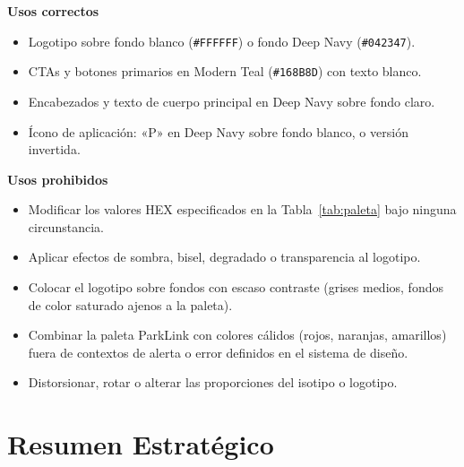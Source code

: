 \documentclass{estilo}
\begin{document}
\begin{mdframed}[backgroundcolor=deepnavy, linewidth=0pt,
  innertopmargin=10pt, innerbottommargin=10pt,
  innerleftmargin=14pt, innerrightmargin=14pt]
\color{white}
\textbf{Usos correctos}
\begin{itemize}[leftmargin=1.2em, itemsep=0.2em, topsep=0.4em]
  \item Logotipo sobre fondo blanco (\texttt{\#FFFFFF}) o fondo Deep Navy (\texttt{\#042347}).
  \item CTAs y botones primarios en Modern Teal (\texttt{\#168B8D}) con texto blanco.
  \item Encabezados y texto de cuerpo principal en Deep Navy sobre fondo claro.
  \item Ícono de aplicación: «P» en Deep Navy sobre fondo blanco, o versión invertida.
\end{itemize}
\end{mdframed}

\vspace{0.5cm}

\begin{mdframed}[backgroundcolor=lightgray, linecolor=midgray, linewidth=0.6pt,
  innertopmargin=10pt, innerbottommargin=10pt,
  innerleftmargin=14pt, innerrightmargin=14pt]
\textbf{Usos prohibidos}
\begin{itemize}[leftmargin=1.2em, itemsep=0.2em, topsep=0.4em]
  \item Modificar los valores HEX especificados en la Tabla~\ref{tab:paleta} bajo ninguna circunstancia.
  \item Aplicar efectos de sombra, bisel, degradado o transparencia al logotipo.
  \item Colocar el logotipo sobre fondos con escaso contraste (grises medios, fondos de color saturado ajenos a la paleta).
  \item Combinar la paleta ParkLink con colores cálidos (rojos, naranjas, amarillos) fuera de contextos de alerta o error definidos en el sistema de diseño.
  \item Distorsionar, rotar o alterar las proporciones del isotipo o logotipo.
\end{itemize}
\end{mdframed}

\section{Resumen Estratégico}
\end{document}
